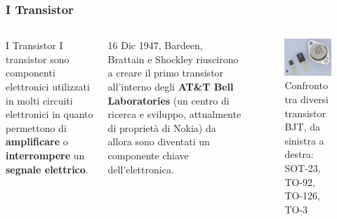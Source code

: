 \begin{frame}
	\frametitle{I Transistor}
	
	\begin{columns}			
		\begin{block}{I Transistor}
			I transistor sono componenti elettronici utilizzati in molti circuiti elettronici in quanto permettono di \textbf{amplificare} o \textbf{interrompere} un \textbf{segnale elettrico}.
		\end{block}
		
		\begin{block}{16 Dic 1947, Bardeen, Brattain e Shockley riuscirono a creare il primo transistor}
			all'interno degli \textbf{AT\&T Bell Laboratories} (un centro di ricerca e sviluppo, attualmente di proprietà di Nokia) da allora sono diventati un componente chiave dell'elettronica.
		\end{block}
		
		\begin{figure}[!htbp]
			\centering 
			\includegraphics[width=0.95\linewidth]{images/2_le_architetture/transistors.jpg}
			\caption{Confronto tra diversi transistor BJT, da sinistra a destra: SOT-23, TO-92, TO-126, TO-3}
		\end{figure}		
	\end{columns}
	
\end{frame}



